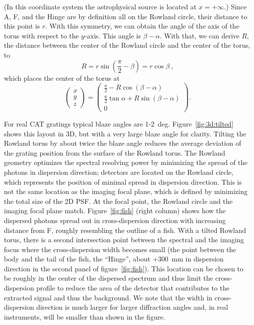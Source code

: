 \documentclass[twocolumn]{aastex631}
\begin{document}
(In this coordinate system the astrophysical source is located at $x=+\infty$.)
Since A, F, and the Hinge are by definition all on the Rowland circle, their distance to this point is $r$. With this symmetry, we can obtain the angle of the axis of the torus with respect to the $y$-axis. This angle is $\beta-\alpha$. With that, we can derive $R$, the distance between the center of the Rowland circle and the center of the torus, to
\begin{equation}
    R = r \sin\left(\frac{\pi}{2} - \beta\right) = r \cos\beta\ ,
\end{equation}
which places the center of the torus at
\begin{equation}
    \begin{pmatrix} x \\ y \\ z \end{pmatrix} =
    \begin{pmatrix}
        \frac{a}{2}-R\cos{(\beta-\alpha)} \\
        \frac{a}{2}\tan{\alpha}+R\sin{(\beta-\alpha)}
        \\ 0
        \end{pmatrix}.
\end{equation}

For real CAT gratings typical blaze angles are 1-2~deg. Figure~\ref{fig:3d:tilted} shows this layout in 3D, but with a very large blaze angle for clarity. Tilting the Rowland torus by about twice the blaze angle reduces the average deviation of the grating position from the surface of the Rowland torus.
The Rowland geometry optimizes the spectral resolving power by minimizing the spread of the photons in dispersion direction; detectors are located on the Rowland circle, which represents the position of minimal spread in dispersion direction. This is not the same location as the imaging focal plane, which is defined by minimizing the total size of the 2D PSF. At the focal point, the Rowland circle and the imaging focal plane match. Figure~\ref{fig:fish} (right column) shows how the dispersed photons spread out in cross-dispersion direction with increasing distance from F, roughly resembling the outline of a fish. With a tilted Rowland torus, there is a second intersection point between the spectral and the imaging focus where the cross-dispersion width becomes small (the point between the body and the tail of the fish, the ``Hinge'', about +300~mm in dispersion direction in the second panel of figure~\ref{fig:fish}). This location can be chosen to be roughly in the center of the dispersed spectrum and thus limit the cross-dispersion profile to reduce the area of the detector that contributes to the extracted signal and thus the background. We note that the width in cross-dispersion direction is much larger for larger diffraction angles and, in real instruments, will be smaller than shown in the figure.
\end{document}
